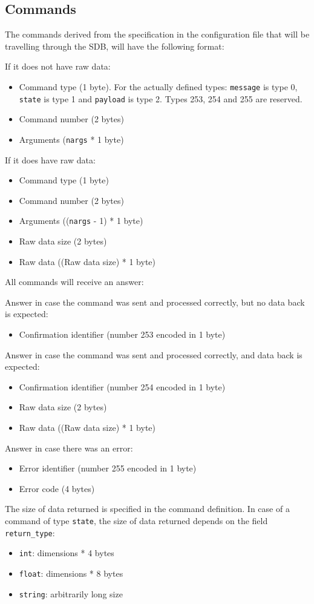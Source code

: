 \documentclass[12pt,a4paper]{report}
\begin{document}
\subsection*{Commands}
The commands derived from the specification in the configuration file that will be travelling through the SDB, will have the following format:

If it does not have raw data:
\begin{itemize}
\item Command type (1 byte). For the actually defined types: \texttt{message} is type 0, \texttt{state} is type 1 and \texttt{payload} is type 2. Types 253, 254 and 255 are reserved.
\item Command number (2 bytes)
\item Arguments (\texttt{nargs} * 1 byte)
\end{itemize}

If it does have raw data:
\begin{itemize}
\item Command type (1 byte)
\item Command number (2 bytes)
\item Arguments ((\texttt{nargs} - 1) * 1 byte)
\item Raw data size (2 bytes)
\item Raw data ((Raw data size) * 1 byte)
\end{itemize}

All commands will receive an answer:

Answer in case the command was sent and processed correctly, but no data back is expected:
\begin{itemize}
\item Confirmation identifier (number 253 encoded in 1 byte)
\end{itemize}

Answer in case the command was sent and processed correctly, and data back is expected:
\begin{itemize}
\item Confirmation identifier (number 254 encoded in 1 byte)
\item Raw data size (2 bytes)
\item Raw data ((Raw data size) * 1 byte)
\end{itemize}

Answer in case there was an error:
\begin{itemize}
\item Error identifier (number 255 encoded in 1 byte)
\item Error code (4 bytes)
\end{itemize}

The size of data returned is specified in the command definition. In case of a command of type \texttt{state}, the size of data returned depends on the field \texttt{return\_type}:
\begin{itemize}
\item \texttt{int}: dimensions * 4 bytes
\item \texttt{float}: dimensions * 8 bytes
\item \texttt{string}: arbitrarily long size
\end{itemize}
\end{document}
